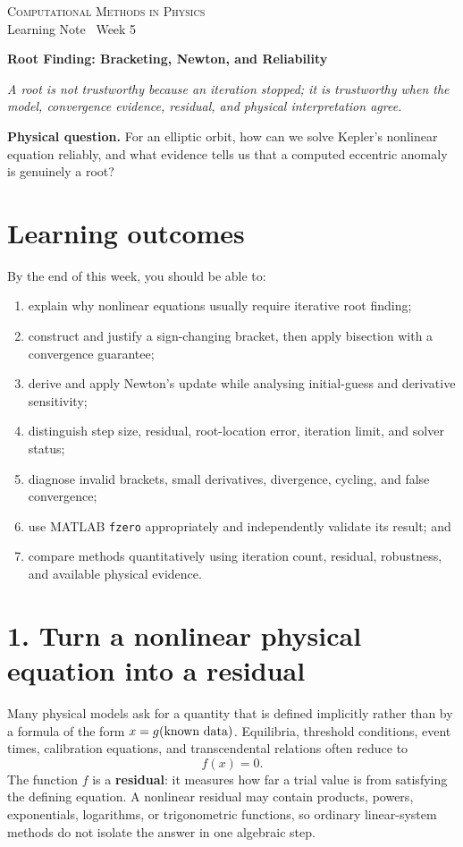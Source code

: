 \documentclass[11pt,a4paper]{article}
\newcommand{\course}{Computational Methods in Physics}
\begin{document}
{\large\textsc{\course}}\\[-2pt]
{\small Learning Note \textbar\ Week 5}\par\vspace{4pt}
{\LARGE\bfseries Root Finding: Bracketing, Newton, and Reliability}\par\vspace{3pt}
\textit{A root is not trustworthy because an iteration stopped; it is trustworthy when the model, convergence evidence, residual, and physical interpretation agree.}

\begin{keybox}
\textbf{Physical question.} For an elliptic orbit, how can we solve Kepler's nonlinear equation reliably, and what evidence tells us that a computed eccentric anomaly is genuinely a root?
\end{keybox}

\section*{Learning outcomes}
By the end of this week, you should be able to:
\begin{enumerate}[nosep,leftmargin=5mm]
  \item explain why nonlinear equations usually require iterative root finding;
  \item construct and justify a sign-changing bracket, then apply bisection with a convergence guarantee;
  \item derive and apply Newton's update while analysing initial-guess and derivative sensitivity;
  \item distinguish step size, residual, root-location error, iteration limit, and solver status;
  \item diagnose invalid brackets, small derivatives, divergence, cycling, and false convergence;
  \item use MATLAB \texttt{fzero} appropriately and independently validate its result; and
  \item compare methods quantitatively using iteration count, residual, robustness, and available physical evidence.
\end{enumerate}

\section*{1. Turn a nonlinear physical equation into a residual}
Many physical models ask for a quantity that is defined implicitly rather than by a formula of the form $x=g(\hbox{known data})$. Equilibria, threshold conditions, event times, calibration equations, and transcendental relations often reduce to
\begin{equation}
 f(x)=0.
\end{equation}
The function $f$ is a \textbf{residual}: it measures how far a trial value is from satisfying the defining equation. A nonlinear residual may contain products, powers, exponentials, logarithms, or trigonometric functions, so ordinary linear-system methods do not isolate the answer in one algebraic step.
\end{document}
